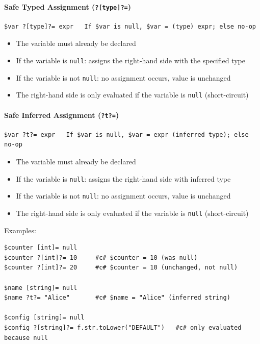 \paragraph{Safe Typed Assignment (\texttt{?[type]?=})}
\begin{verbatim}
$var ?[type]?= expr   If $var is null, $var = (type) expr; else no-op
\end{verbatim}
\begin{itemize}
\item The variable must already be declared
\item If the variable is \texttt{null}: assigns the right-hand side with the specified type
\item If the variable is not \texttt{null}: no assignment occurs, value is unchanged
\item The right-hand side is only evaluated if the variable is \texttt{null} (short-circuit)
\end{itemize}

\paragraph{Safe Inferred Assignment (\texttt{?t?=})}
\begin{verbatim}
$var ?t?= expr   If $var is null, $var = expr (inferred type); else no-op
\end{verbatim}
\begin{itemize}
\item The variable must already be declared
\item If the variable is \texttt{null}: assigns the right-hand side with inferred type
\item If the variable is not \texttt{null}: no assignment occurs, value is unchanged
\item The right-hand side is only evaluated if the variable is \texttt{null} (short-circuit)
\end{itemize}

Examples:
\begin{verbatim}
$counter [int]= null
$counter ?[int]?= 10     #c# $counter = 10 (was null)
$counter ?[int]?= 20     #c# $counter = 10 (unchanged, not null)

$name [string]= null
$name ?t?= "Alice"       #c# $name = "Alice" (inferred string)

$config [string]= null
$config ?[string]?= f.str.toLower("DEFAULT")   #c# only evaluated because null
\end{verbatim}

